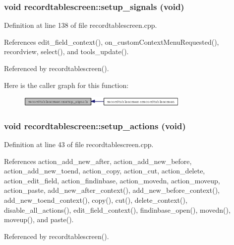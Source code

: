 \subsubsection{\setlength{\rightskip}{0pt plus 5cm}void recordtablescreen::setup\_\-signals (void)\hspace{0.3cm}{\tt  [private]}}\label{classrecordtablescreen_63e5dbd8f4f958c226f79e422b0f17e3}




Definition at line 138 of file recordtablescreen.cpp.

References edit\_\-field\_\-context(), on\_\-custom\-Context\-Menu\-Requested(), recordview, select(), and tools\_\-update().

Referenced by recordtablescreen().

Here is the caller graph for this function:\begin{figure}[H]
\begin{center}
\leavevmode
\includegraphics[width=235pt]{classrecordtablescreen_63e5dbd8f4f958c226f79e422b0f17e3_icgraph}
\end{center}
\end{figure}
\subsubsection{\setlength{\rightskip}{0pt plus 5cm}void recordtablescreen::setup\_\-actions (void)\hspace{0.3cm}{\tt  [private]}}\label{classrecordtablescreen_4e8f0ecaef3b8ea55c68ec06386b84ce}




Definition at line 43 of file recordtablescreen.cpp.

References action\_\-add\_\-new\_\-after, action\_\-add\_\-new\_\-before, action\_\-add\_\-new\_\-toend, action\_\-copy, action\_\-cut, action\_\-delete, action\_\-edit\_\-field, action\_\-findinbase, action\_\-movedn, action\_\-moveup, action\_\-paste, add\_\-new\_\-after\_\-context(), add\_\-new\_\-before\_\-context(), add\_\-new\_\-toend\_\-context(), copy(), cut(), delete\_\-context(), disable\_\-all\_\-actions(), edit\_\-field\_\-context(), findinbase\_\-open(), movedn(), moveup(), and paste().

Referenced by recordtablescreen().

